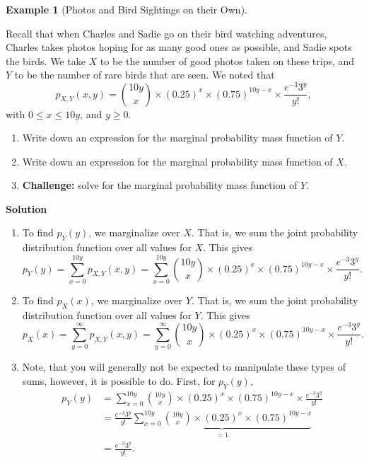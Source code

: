 \documentclass[
  letterpaper,
  DIV=11,
  numbers=noendperiod]{scrreprt}
\providecommand{\tightlist}{%
  \setlength{\itemsep}{0pt}\setlength{\parskip}{0pt}}\usepackage{longtable,booktabs,array}
\theoremstyle{definition}
\theoremstyle{definition}
\newtheorem{example}{Example}[chapter]
\theoremstyle{definition}
\theoremstyle{remark}
\begin{document}
\begin{example}[Photos and Bird Sightings on their
Own]\protect\hypertarget{exm-conditioning}{}\label{exm-conditioning}

Recall that when Charles and Sadie go on their bird watching adventures,
Charles takes photos hoping for as many good ones as possible, and Sadie
spots the birds. We take \(X\) to be the number of good photos taken on
these trips, and \(Y\) to be the number of rare birds that are seen. We
noted that
\[p_{X,Y}(x, y) = \binom{10y}{x}\times(0.25)^{x}\times(0.75)^{10y - x}\times\frac{e^{-3}3^y}{y!},\]
with \(0 \leq x \leq 10y\), and \(y \geq 0\).

\begin{enumerate}
\def\labelenumi{\alph{enumi}.}
\tightlist
\item
  Write down an expression for the marginal probability mass function of
  \(Y\).
\item
  Write down an expression for the marginal probability mass function of
  \(X\).
\item
  \textbf{Challenge:} solve for the marginal probability mass function
  of \(Y\).
\end{enumerate}

\begin{tcolorbox}[enhanced jigsaw, colback=white, colframe=quarto-callout-color-frame, arc=.35mm, leftrule=.75mm, rightrule=.15mm, opacityback=0, breakable, bottomrule=.15mm, left=2mm, toprule=.15mm]

\vspace{-3mm}\textbf{Solution}\vspace{3mm}

\begin{enumerate}
\def\labelenumi{\alph{enumi}.}
\item
  To find \(p_Y(y)\), we marginalize over \(X\). That is, we sum the
  joint probability distribution function over all values for \(X\).
  This gives
  \[p_Y(y) = \sum_{x = 0}^{10y} p_{X,Y}(x, y) = \sum_{x = 0}^{10y} \binom{10y}{x}\times(0.25)^{x}\times(0.75)^{10y - x}\times\frac{e^{-3}3^y}{y!}.\]
\item
  To find \(p_X(x)\), we marginalize over \(Y\). That is, we sum the
  joint probability distribution function over all values for \(Y\).
  This gives
  \[p_X(x) = \sum_{y = 0}^{\infty} p_{X,Y}(x, y) = \sum_{y = 0}^{\infty} \binom{10y}{x}\times(0.25)^{x}\times(0.75)^{10y - x}\times\frac{e^{-3}3^y}{y!}.\]
\item
  Note, that you will generally not be expected to manipulate these
  types of sums, however, it is possible to do. First, for \(p_Y(y)\),
  \begin{align*}
  p_Y(y) &= \sum_{x = 0}^{10y} \binom{10y}{x}\times(0.25)^{x}\times(0.75)^{10y - x}\times\frac{e^{-3}3^y}{y!} \\
  &= \frac{e^{-3}3^y}{y!}\underbrace{\sum_{x = 0}^{10y} \binom{10y}{x}\times(0.25)^{x}\times(0.75)^{10y - x}}_{=1} \\
  &= \frac{e^{-3}3^y}{y!}.
  \end{align*}
\end{enumerate}


\end{tcolorbox}
\end{example}
\end{document}
